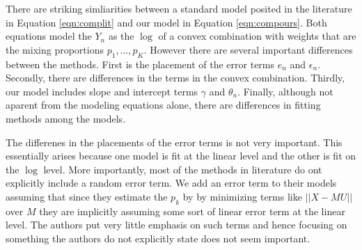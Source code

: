 \documentclass[reqno,12pt,oneside]{report}\usepackage[]{graphicx}\usepackage[]{color}
\theoremstyle{plain}
\theoremstyle{definition}
\theoremstyle{remark}
\numberwithin{theorem}{chapter}     %
\begin{document}
There are striking simliarities between a standard model posited in the literature in Equation \ref{eqn:complit} and our model in Equation \ref{eqn:compours}. Both equations model the $Y_n$ as the $\log$ of a convex combination with weights that are the mixing proportions $p_1,\ldots,p_K$. However there are several important differences between the methods. First is the placement of the error terms $e_n$ and $\epsilon_n$. Secondly, there are differences in the terms in the convex combination. Thirdly, our model includes slope and intercept terms $\gamma$ and $\theta_n$. Finally, although not aparent from the modeling equations alone, there are differences in fitting methods among the models. 

The differenes in the placements of the error terms is not very important. This essentially arises because one model is fit at the linear level and the other is fit on the $\log$ level. More importantly, most of the methods in literature do ont explicitly include a random error term. We add an error term to their models assuming that since they estimate the $p_k$ by by minimizing terms like $||X-MU||$ over $M$ they are implicitly assuming some sort of linear error term at the linear level. The authors put very little emphasis on such terms and hence focusing on something the authors do not explicitly state does not seem important. 
\end{document}
